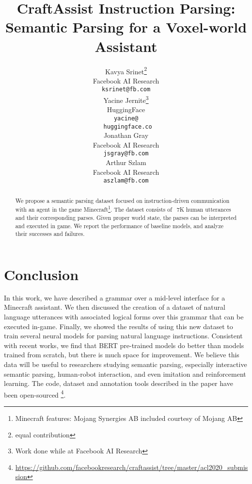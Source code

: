 \documentclass[11pt,a4paper]{article}
\title{CraftAssist Instruction Parsing: Semantic Parsing for a Voxel-world Assistant}
\author{Kavya Srinet\thanks{ equal contribution} \\
  Facebook AI Research  \\
  {\texttt{ksrinet@fb.com} }\\\And
  Yacine Jernite\printfnsymbol{1}\thanks{Work done while at Facebook AI Research} \\
  HuggingFace  \\ 
  {\texttt{yacine@}}\\
  {\texttt{ huggingface.co} }\\\And
  Jonathan Gray \\
  Facebook AI Research  \\
  {\texttt{jsgray@fb.com}} \\\And
  Arthur Szlam \\
  Facebook AI Research  \\
  {\texttt{aszlam@fb.com} }\\}
\date{}
\begin{document}
\maketitle
\begin{abstract}
We propose a semantic parsing dataset focused on instruction-driven communication with an agent in the game Minecraft\footnote{Minecraft features: \textcopyright Mojang Synergies AB included courtesy of Mojang AB}.  
The dataset consists of 
 ~7K human utterances and their corresponding parses.  Given proper world state, the parses can be interpreted and executed in game. 
We report the performance of baseline models, and analyze their successes and failures.
\end{abstract}








\section{Conclusion}
In this work, we have described a grammar over a mid-level interface for a Minecraft assistant. We then discussed the creation of a dataset of natural language utterances with associated logical forms over this grammar that can be executed in-game. Finally, we showed the results of using this new dataset to train several neural models for parsing natural language instructions.  %
Consistent with recent works, we find that BERT pre-trained models do better than models trained from scratch, but there is much space for improvement.
We believe this data will be useful to researchers studying semantic parsing, especially interactive semantic parsing, human-robot interaction, and even imitation and reinforcement learning. The code, dataset and annotation tools described in the paper have been open-sourced \footnote{\url{https://github.com/facebookresearch/craftassist/tree/master/acl2020_submission}}. 
\end{document}
